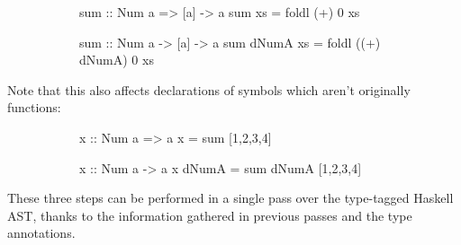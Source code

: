 \documentclass[dissertation.tex]{subfiles}
\begin{document}
{{{\begin{enumerate}
{                \begin{figure}[H]
                \centering
                \begin{subfigure}[t]{0.30\textwidth}
                \begin{haskellfigure}
                sum :: Num a => [a] -> a
                sum xs = foldl (+) 0 xs
                \end{haskellfigure}
                \end{subfigure}
                \hspace{5mm}
                \begin{subfigure}[t]{0.45\textwidth}
                \begin{haskellfigure}
                sum :: Num a -> [a] -> a
                sum dNumA xs = foldl ((+) dNumA) 0 xs
                \end{haskellfigure}
                \end{subfigure}
                \end{figure}

                Note that this also affects declarations of symbols which aren't originally functions:

                \begin{figure}[H]
                \centering
                \begin{subfigure}[t]{0.30\textwidth}
                \begin{haskellfigure}
                x :: Num a => a
                x = sum [1,2,3,4]
                \end{haskellfigure}
                \end{subfigure}
                \hspace{5mm}
                \begin{subfigure}[t]{0.45\textwidth}
                \begin{haskellfigure}
                x :: Num a -> a
                x dNumA = sum dNumA [1,2,3,4]
                \end{haskellfigure}
                \end{subfigure}
                \end{figure}

            }
            \end{enumerate}

            These three steps can be performed in a single pass over the type-tagged Haskell AST, thanks to the
            information gathered in previous passes and the type annotations.

}}}
\end{document}
